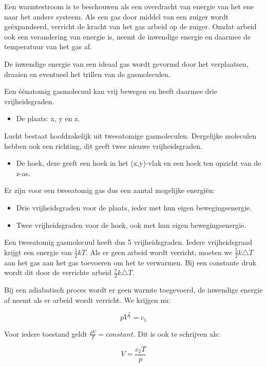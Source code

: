 Een warmtestroom is te beschouwen als een overdracht van energie van
het ene naar het andere systeem. Als een gas door middel van een zuiger
wordt geëxpandeerd, verricht de kracht van het gas arbeid op de zuiger.
Omdat arbeid ook een verandering van energie is, neemt de inwendige
energie en daarmee de temperatuur van het gas af. 

De inwendige energie van een ideaal gas wordt gevormd door het verplaatsen,
draaien en eventueel het trillen van de gasmoleculen.

Een éénatomig gasmolecuul kan vrij bewegen en heeft daarmee drie vrijheidsgraden.
\begin{itemize}
\item De plaats: x, y en z. 
\end{itemize}
Lucht bestaat hoofdzakelijk uit tweeatomige gasmoleculen. Dergelijke
moleculen hebben ook een richting, dit geeft twee nieuwe vrijheidsgraden.
\begin{itemize}
\item De hoek, deze geeft een hoek in het (x,y)-vlak en een hoek ten opzicht
van de z-as.
\end{itemize}
Er zijn voor een tweeatomig gas dus een aantal mogelijke energiën:
\begin{itemize}
\item Drie vrijheidsgraden voor de plaats, ieder met hun eigen bewegingsenergie.
\item Twee vrijheidsgraden voor de hoek, ook met hun eigen bewegingsenergie.
\end{itemize}
Een tweeatomig gasmolecuul heeft dus 5 vrijheidsgraden. Iedere vrijheidsgraad
krijgt een energie van $\frac{1}{2}kT$. Als er geen arbeid wordt
verricht, moeten we $\frac{5}{2}k\triangle T$ aan het gas aan het
gas toevoeren om het te verwarmen. Bij een constante druk wordt dit
door de verrichte arbeid $\frac{7}{2}k\triangle T$. 

Bij een adiabatisch proces wordt er geen warmte toegevoerd, de inwendige
energie af neemt als er arbeid wordt verricht. We krijgen nu:

\begin{equation}
pV^{\frac{7}{5}}=c_{1}
\end{equation}


Voor iedere toestand geldt $\frac{pV}{T}=constant$. Dit is ook te
schrijven als:

\begin{equation}
V=\frac{c_{2}T}{p}
\end{equation}


